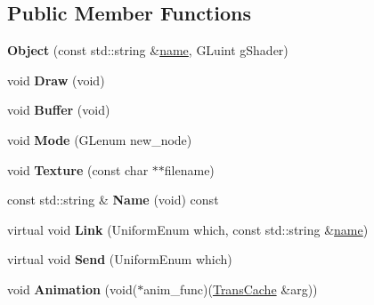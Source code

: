 \subsection*{Public Member Functions}
\begin{DoxyCompactItemize}
\item 
\hypertarget{class_object_aacf42e81415f32f1f2a105ce29c7c1b9}{{\bfseries Object} (const std\-::string \&\hyperlink{class_object_a24457e0a387492c80594aec7681a2277}{name}, G\-Luint g\-Shader)}\label{class_object_aacf42e81415f32f1f2a105ce29c7c1b9}

\item 
\hypertarget{class_object_a3afa1b9af32b78d81b5de0836c511aeb}{void {\bfseries Draw} (void)}\label{class_object_a3afa1b9af32b78d81b5de0836c511aeb}

\item 
\hypertarget{class_object_a35c89a8eb8a5b742a9025331119bfc7c}{void {\bfseries Buffer} (void)}\label{class_object_a35c89a8eb8a5b742a9025331119bfc7c}

\item 
\hypertarget{class_object_ac6ccf69d21c4c902c62829c48ef6cf5b}{void {\bfseries Mode} (G\-Lenum new\-\_\-node)}\label{class_object_ac6ccf69d21c4c902c62829c48ef6cf5b}

\item 
\hypertarget{class_object_aa104adfbcc2cae4bd68c053cc3dab721}{void {\bfseries Texture} (const char $\ast$$\ast$filename)}\label{class_object_aa104adfbcc2cae4bd68c053cc3dab721}

\item 
\hypertarget{class_object_a890760dff9df547454112ff84510040c}{const std\-::string \& {\bfseries Name} (void) const }\label{class_object_a890760dff9df547454112ff84510040c}

\item 
\hypertarget{class_object_accde5aa6e8d0d582719e94c414c2341c}{virtual void {\bfseries Link} (Uniform\-Enum which, const std\-::string \&\hyperlink{class_object_a24457e0a387492c80594aec7681a2277}{name})}\label{class_object_accde5aa6e8d0d582719e94c414c2341c}

\item 
\hypertarget{class_object_ad4e7b46cb40ec1f9a95384a5d1bfb5c4}{virtual void {\bfseries Send} (Uniform\-Enum which)}\label{class_object_ad4e7b46cb40ec1f9a95384a5d1bfb5c4}

\item 
\hypertarget{class_object_ae3226b31c80c9f276ffdee65101c8fa6}{void {\bfseries Animation} (void($\ast$anim\-\_\-func)(\hyperlink{class_trans_cache}{Trans\-Cache} \&arg))}\label{class_object_ae3226b31c80c9f276ffdee65101c8fa6}


\end{DoxyCompactItemize}
